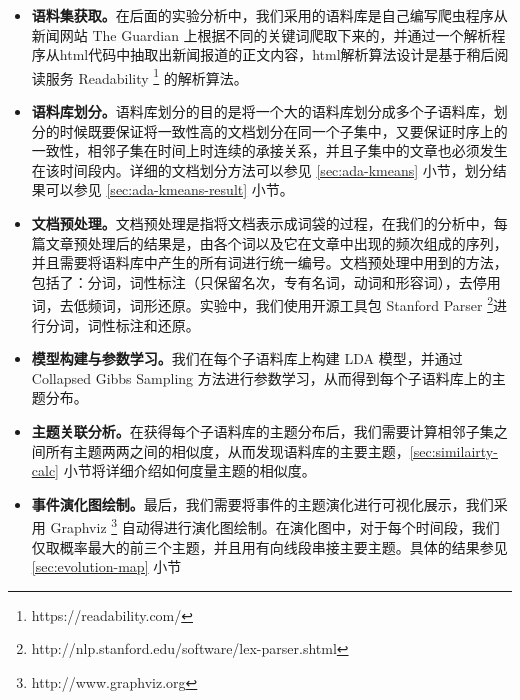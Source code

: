 \begin{itemize}
\item \textbf{语料集获取。}在后面的实验分析中，我们采用的语料库是自己编写爬虫程序从新闻网站  The Guardian 上根据不同的关键词爬取下来的，并通过一个解析程序从html代码中抽取出新闻报道的正文内容，html解析算法设计是基于稍后阅读服务 Readability \footnote{https://readability.com/} 的解析算法。
\item \textbf{语料库划分。}语料库划分的目的是将一个大的语料库划分成多个子语料库，划分的时候既要保证将一致性高的文档划分在同一个子集中，又要保证时序上的一致性，相邻子集在时间上时连续的承接关系，并且子集中的文章也必须发生在该时间段内。详细的文档划分方法可以参见 \ref{sec:ada-kmeans} 小节，划分结果可以参见 \ref{sec:ada-kmeans-result} 小节。
\item \textbf{文档预处理。}文档预处理是指将文档表示成词袋的过程，在我们的分析中，每篇文章预处理后的结果是，由各个词以及它在文章中出现的频次组成的序列，并且需要将语料库中产生的所有词进行统一编号。文档预处理中用到的方法，包括了：分词，词性标注（只保留名次，专有名词，动词和形容词），去停用词，去低频词，词形还原。实验中，我们使用开源工具包 Stanford Parser \footnote{http://nlp.stanford.edu/software/lex-parser.shtml}进行分词，词性标注和还原。
\item \textbf{模型构建与参数学习。}我们在每个子语料库上构建 LDA 模型，并通过 Collapsed Gibbs Sampling \cite{griffiths2004finding, heinrich2005parameter} 方法进行参数学习，从而得到每个子语料库上的主题分布。
\item \textbf{主题关联分析。}在获得每个子语料库的主题分布后，我们需要计算相邻子集之间所有主题两两之间的相似度，从而发现语料库的主要主题，\ref{sec:similairty-calc} 小节将详细介绍如何度量主题的相似度。
\item \textbf{事件演化图绘制。}最后，我们需要将事件的主题演化进行可视化展示，我们采用 Graphviz \footnote{http://www.graphviz.org} 自动得进行演化图绘制。在演化图中，对于每个时间段，我们仅取概率最大的前三个主题，并且用有向线段串接主要主题。具体的结果参见 \ref{sec:evolution-map} 小节
\end{itemize}

